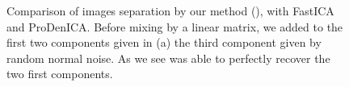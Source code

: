\begin{figure}[t]
\begin{center}
\end{center}
\caption{Comparison of images separation by our method (\ICA), with FastICA and ProDenICA. Before mixing by a linear matrix, we added to the first two components given in (a) the third component given by random
normal noise. As we see \ICA{} was able to perfectly recover the two first components.}
\label{fig:image_ICA_int}
\end{figure}

